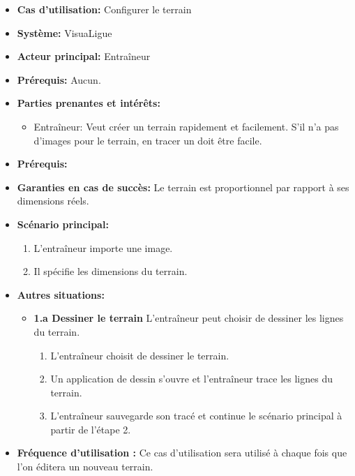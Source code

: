 \begin{itemize}
    \item \textbf{Cas d'utilisation:} Configurer le terrain
    \item \textbf{Syst\`eme:} VisuaLigue
    \item \textbf{Acteur principal:} Entra\^ineur
    \item \textbf{Pr\'erequis:} Aucun.
    \item \textbf{Parties prenantes et int\'er\^ets:}
        \begin{itemize}
            \item Entraîneur: Veut créer un terrain rapidement et facilement. S'il n'a pas d'images pour le terrain, en tracer un doit être facile.
        \end{itemize}
    \item \textbf{Pr\'erequis:}
    \item \textbf{Garanties en cas de succ\`es:} Le terrain est proportionnel par rapport à ses dimensions réels.
    \item \textbf{Sc\'enario principal:}
        \begin{enumerate}
            \item L'entraîneur importe une image.
            \item Il spécifie les dimensions du terrain.
    \end{enumerate}
    \item \textbf{Autres situations:}
        \begin{itemize}
            \item \textbf{1.a Dessiner le terrain} L'entraîneur peut choisir de dessiner les lignes du terrain.
                \begin{enumerate}
                    \item L'entraîneur choisit de dessiner le terrain.
                    \item Un application de dessin s'ouvre et l'entraîneur trace les lignes du terrain.
                    \item L'entraîneur sauvegarde son tracé et continue le scénario principal à partir de l'étape 2.
               \end{enumerate}
 
        \end{itemize}
  	\item \textbf{Fréquence d'utilisation :} Ce cas d'utilisation sera utilisé à chaque fois que l'on éditera un nouveau terrain.
\end{itemize}




